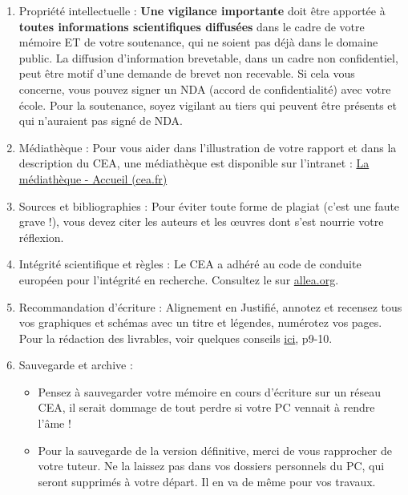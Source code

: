 \begin{enumerate}
    \item Propriété intellectuelle : \textbf{Une vigilance importante} doit être apportée à \textbf{toutes informations scientifiques diffusées} dans le cadre de votre mémoire ET de votre soutenance, qui ne soient pas déjà dans le domaine public. La diffusion d’information brevetable, dans un cadre non confidentiel, peut être motif d’une demande de brevet non recevable. Si cela vous concerne, vous pouvez signer un NDA (accord de confidentialité) avec votre école. Pour la soutenance, soyez vigilant au tiers qui peuvent être présents et qui n’auraient pas signé de NDA.
    \item Médiathèque : Pour vous aider dans l’illustration de votre rapport et dans la description du CEA, une médiathèque est disponible sur l’intranet : \href{https://portail.intra.cea.fr/multimedia}{La médiathèque - Accueil (cea.fr)}
    \item Sources et bibliographies : Pour éviter toute forme de plagiat (c’est une faute grave !), vous devez citer les auteurs et les œuvres dont s’est nourrie votre réflexion.
    \item Intégrité scientifique et règles : Le CEA a adhéré au code de conduite européen pour l’intégrité en recherche. Consultez le sur \href{https://allea.org/code-of-conduct/}{allea.org}.
    \item Recommandation d’écriture : Alignement en Justifié, annotez et recensez tous vos graphiques et schémas avec un titre et légendes, numérotez vos pages. Pour la rédaction des livrables, voir quelques conseils \href{https://www.sciencespo-lille.eu/sites/default/files/guide_preparer_et_rediger_un_memoire_de_recherche.pdf}{ici}, p9-10.
    \item Sauvegarde et archive :
    \begin{itemize}
        \item Pensez à sauvegarder votre mémoire en cours d’écriture sur un réseau CEA, il serait dommage de tout perdre si votre PC vennait à rendre l’âme !
        \item Pour la sauvegarde de la version définitive, merci de vous rapprocher de votre tuteur. Ne la laissez pas dans vos dossiers personnels du PC, qui seront supprimés à votre départ. Il en va de même pour vos travaux.
    \end{itemize}
\end{enumerate}

\clearpage